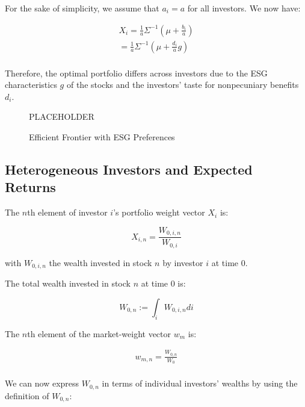 For the sake of simplicity, we assume that $a_i = a$ for all investors.
We now have:

\begin{equation}
    \begin{aligned}
    X_i = \frac{1}{a} \Sigma^{-1}(\mu + \frac{b_i}{a}) \\
    = \frac{1}{a} \Sigma^{-1}(\mu + \frac{d_i}{a}g) \\
    \end{aligned}
\end{equation}

Therefore, the optimal portfolio differs across investors due to the
ESG characteristics $g$ of the stocks and the investors' taste for
nonpecuniary benefits $d_i$. 


\begin{figure}
    \centering
    PLACEHOLDER
    \caption{Efficient Frontier with ESG Preferences}
    \label{fig:esg_taste}
\end{figure}

\subsection{Heterogeneous Investors and Expected Returns}


The $n$th element of investor $i$'s portfolio weight vector $X_i$ is:

\begin{equation}
    X_{i,n} = \frac{W_{0,i,n}}{W_{0,i}}
\end{equation}

with $W_{0,i,n}$ the wealth invested in stock $n$ by investor $i$ at time 0.

The total wealth invested in stock $n$ at time 0 is:

\begin{equation}
    W_{0,n} := \int_i W_{0,i,n} di
\end{equation}

The $n$th element of the market-weight vector $w_m$ is:

\begin{equation}
    \begin{aligned}
    w_{m,n} = \frac{W_{0,n}}{W_{0}} \\
    \end{aligned}
\end{equation}

We can now express $W_{0,n}$ in terms of individual investors' wealths
by using the definition of $W_{0,n}$:

